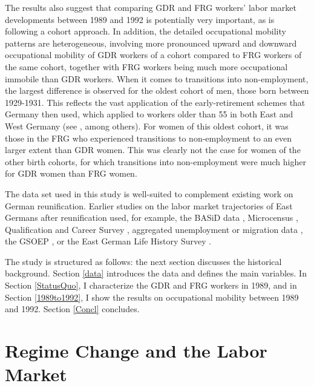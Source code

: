 \begin{Article}
\begin{refsection}[Spitz]
The results also suggest that comparing GDR and FRG workers' labor market developments between 1989 and 1992 is potentially very important, as is following a cohort approach. In addition, the detailed occupational mobility patterns are heterogeneous, involving more pronounced upward and downward occupational mobility of GDR workers of a cohort compared to FRG workers of the same cohort, together with FRG workers being much more occupational immobile than GDR workers. When it comes to transitions into non-employment, the largest difference is observed for the oldest cohort of men, those born between 1929-1931. This reflects the vast application of the early-retirement schemes that Germany then used, which applied to workers older than 55 in both East and West Germany (see \textcite{BorschSupranSchmidt2001}, among others). For women of this oldest cohort, it was those in the FRG who experienced transitions to non-employment to an even larger extent than GDR women. This was clearly not the case for women of the other birth cohorts, for which transitions into non-employment were much higher for GDR women than FRG women.


The data set used in this study is well-suited to complement existing work on German reunification. Earlier studies on the labor market trajectories of East Germans after reunification used, for example, the BASiD data \parencite{EmmlerFitzenberger2020}, Microcensus \parencite{FuchsSchundelnSchundeln2009}, Qualification and Career Survey \parencite{PrantlSpitzOener2020,PrantlSpitzOener2009}, aggregated unemployment or migration data \parencite{FuchsSchundelnIzem2012}, the GSOEP \parencite{BurdaHunt2001,Hunt2006,AlesinaFuchsSchundeln2007,FuchsSchundelnSchundeln2009,FuchsSchundelnIzem2012,Stauder2018,EmmlerFitzenberger2020}, or the East German Life History Survey \parencite{HuininkSolga1994}.

The study is structured as follows: the next section discusses the historical background. Section \ref{data} introduces the data and defines the main variables. In Section \ref{StatusQuo}, I characterize the GDR and FRG workers in 1989, and in Section \ref{1989to1992}, I show the results on occupational mobility between 1989 and 1992. Section \ref{Concl} concludes.

\section{Regime Change and the Labor Market}



\end{refsection}
\end{Article}
